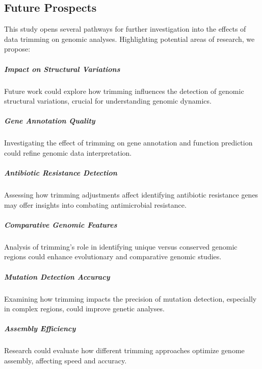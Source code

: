 \begin{spacing}{0.9}
\chapter{Future Prospects}


This study opens several pathways for further investigation into the effects of data trimming on genomic analyses. Highlighting potential areas of research, we propose:

\paragraph{Impact on Structural Variations} Future work could explore how trimming influences the detection of genomic structural variations, crucial for understanding genomic dynamics.

\paragraph{Gene Annotation Quality} Investigating the effect of trimming on gene annotation and function prediction could refine genomic data interpretation.

\paragraph{Antibiotic Resistance Detection} Assessing how trimming adjustments affect identifying antibiotic resistance genes may offer insights into combating antimicrobial resistance.

\paragraph{Comparative Genomic Features} Analysis of trimming's role in identifying unique versus conserved genomic regions could enhance evolutionary and comparative genomic studies.

\paragraph{Mutation Detection Accuracy} Examining how trimming impacts the precision of mutation detection, especially in complex regions, could improve genetic analyses.

\paragraph{Assembly Efficiency} Research could evaluate how different trimming approaches optimize genome assembly, affecting speed and accuracy.


\end{spacing}
